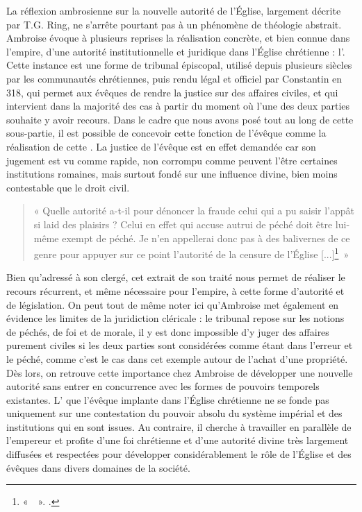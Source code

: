 La réflexion ambrosienne sur la nouvelle autorité de l’Église, largement décrite par T.G. Ring, ne s’arrête pourtant pas à un phénomène de théologie abstrait. Ambroise évoque à plusieurs reprises la réalisation concrète, et bien connue dans l’empire, d’une autorité institutionnelle et juridique dans l’Église chrétienne : l’. Cette instance est une forme de tribunal épiscopal, utilisé depuis plusieurs siècles par les communautés chrétiennes, puis rendu légal et officiel par Constantin en 318, qui permet aux évêques de rendre la justice sur des affaires civiles, et qui intervient dans la majorité des cas à partir du moment où l'une des deux parties souhaite y avoir recours. Dans le cadre que nous avons posé tout au long de cette sous-partie, il est possible de concevoir cette fonction de l’évêque comme la réalisation de cette . La justice de l’évêque est en effet demandée car son jugement est vu comme rapide, non corrompu comme peuvent l’être certaines institutions romaines, mais surtout fondé sur une influence divine, bien moins contestable que le droit civil.

\bigskip

\begin{quote}
    « Quelle autorité a-t-il pour dénoncer la fraude celui qui a pu saisir l’appât si laid des plaisirs ? Celui en effet qui accuse autrui de péché doit être lui-même exempt de péché. Je n’en appellerai donc pas à des balivernes de ce genre pour appuyer sur ce point l’autorité de la censure de l’Église [...]\footnote{«~~». \cite[\nopp III, 72]{ambroise_devoirs_2}.}~»
\end{quote}

\bigskip

Bien qu’adressé à son clergé, cet extrait de son traité  nous permet de réaliser le recours récurrent, et même nécessaire pour l’empire, à cette forme d’autorité et de législation. On peut tout de même noter ici qu’Ambroise met également en évidence les limites de la juridiction cléricale : le tribunal repose sur les notions de péchés, de foi et de morale, il y est donc impossible d’y juger des affaires purement civiles si les deux parties sont considérées comme étant dans l’erreur et le péché, comme c’est le cas dans cet exemple autour de l’achat d’une propriété. Dès lors, on retrouve cette importance chez Ambroise de développer une nouvelle autorité sans entrer en concurrence avec les formes de pouvoirs temporels existantes. L’ que l’évêque implante dans l’Église chrétienne ne se fonde pas uniquement sur une contestation du pouvoir absolu du système impérial et des institutions qui en sont issues. Au contraire, il cherche à travailler en parallèle de l’empereur et profite d’une foi chrétienne et d’une autorité divine très largement diffusées et respectées pour développer considérablement le rôle de l’Église et des évêques dans divers domaines de la société.

